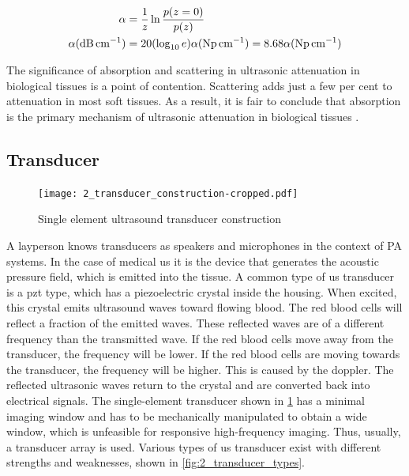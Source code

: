 \begin{subequations} \label{eq:2_attenuation_coefficient}
	\begin{align}
		\ensuremath{\alpha &= \frac{1}{z} \ln \frac{p(z=0)}{p(z)} \\
		\alpha( \si{\dB\per\centi\meter} ) &= 20 ( \log_{10}e) \alpha ( \si{\neper\per\centi\meter}) = 8.68\alpha (\si{\neper\per\centi\meter})}
	\end{align}
\end{subequations}

The significance of absorption and scattering in ultrasonic attenuation in biological tissues is a point of contention. Scattering adds just a few per cent to attenuation in most soft tissues. As a result, it is fair to conclude that absorption is the primary mechanism of ultrasonic attenuation in biological tissues \cite{ShungUltrasound_Book}.

\subsection{Transducer}

\begin{figure}[htbp]
	\centering
	\texttt{[image: 2\_transducer\_construction-cropped.pdf]}
	\caption[Single element ultrasound transducer construction]{Single element ultrasound transducer construction \cite{JensenUltrasoundBook}}
	\label{fig:2_transducer_construction}
\end{figure}

A layperson knows transducers as speakers and microphones in the context of PA systems. In the case of medical \gls{us} it is the device that generates the acoustic pressure field, which is emitted into the tissue. A common type of \gls{us} transducer is a \gls{pzt} type, which has a piezoelectric crystal inside the housing. When excited, this crystal emits ultrasound waves toward flowing blood. The red blood cells will reflect a fraction of the emitted waves. These reflected waves are of a different frequency than the transmitted wave. If the red blood cells move away from the transducer, the frequency will be lower. If the red blood cells are moving towards the transducer, the frequency will be higher. This is caused by the \gls{doppler}. The reflected ultrasonic waves return to the crystal and are converted back into electrical signals. The single-element transducer shown in \cref{fig:2_transducer_construction} has a minimal imaging window and has to be mechanically manipulated to obtain a wide window, which is unfeasible for responsive high-frequency imaging. Thus, usually, a transducer array is used. Various types of \gls{us} transducer exist with different strengths and weaknesses, shown in \cref{fig:2_transducer_types}.

